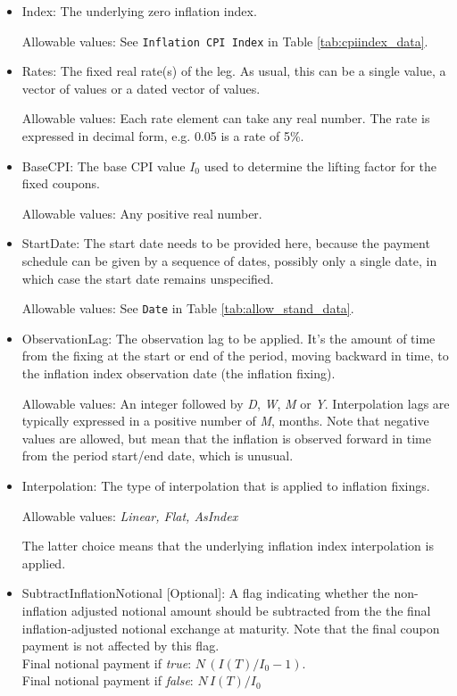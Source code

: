 \begin{itemize}
\item Index: The underlying zero inflation index.

Allowable values:  See \lstinline!Inflation CPI Index! in Table \ref{tab:cpiindex_data}.
\item Rates: The fixed real rate(s) of the leg. As usual, this can be a single value, a vector of values or a dated vector of
  values.
 
 Allowable values: Each rate element can take any  real number. The rate is
  expressed in decimal form, e.g. 0.05 is a rate of 5\%.
\item BaseCPI: The base CPI value $I_0$ used to determine the lifting factor for the fixed coupons.

Allowable values:  Any positive real number.

\item StartDate: The start date needs to be provided here, because the payment
  schedule can be given by a sequence of dates, possibly only a single
  date, in which case the start date remains unspecified.
  
Allowable values:  See \lstinline!Date! in Table \ref{tab:allow_stand_data}. 

\item ObservationLag: The observation lag to be applied. It's the amount of time from the fixing at the start or end of the period, moving backward in time, to the inflation index observation date (the inflation fixing). 

Allowable values: An integer followed by \emph{D}, \emph{W}, \emph{M} or \emph{Y}. Interpolation lags are typically expressed in a positive number of  \emph{M}, months. Note that negative values are allowed, but mean that the inflation is observed forward in time from the period start/end date, which is unusual.  

\item Interpolation: The type of interpolation that is applied to inflation fixings.

Allowable values:  \emph{Linear, Flat, AsIndex} 

\medskip
The latter choice means that the underlying inflation index
interpolation is applied.

\item SubtractInflationNotional [Optional]: A flag indicating whether
  the non-inflation adjusted notional amount should be subtracted from
  the the final inflation-adjusted notional exchange at maturity.
  Note that the final coupon payment is not affected by this flag. \\ 
Final notional payment if \emph{true}: $N \,(I(T)/I_0-1)$. \\ 
Final notional payment if  \emph{false}: $N \,I(T)/I_0$ 


\end{itemize}
